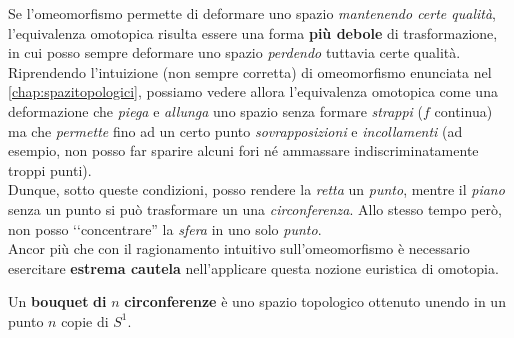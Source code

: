 \begin{intuit}
	Se l'omeomorfismo permette di deformare uno spazio \textit{mantenendo certe qualità}, l'equivalenza omotopica risulta essere una forma \textbf{più debole} di trasformazione, in cui posso sempre deformare uno spazio \textit{perdendo} tuttavia certe qualità.\\
	Riprendendo l'intuizione (non sempre corretta) di omeomorfismo enunciata nel \autoref{chap:spazitopologici}, possiamo vedere allora l'equivalenza omotopica come una deformazione che \textit{piega} e \textit{allunga} uno spazio senza formare \textit{strappi} ($f$ continua) ma che \textit{permette} fino ad un certo punto \textit{sovrapposizioni} e \textit{incollamenti} (ad esempio, non posso far sparire alcuni fori né ammassare indiscriminatamente troppi punti).\\
	Dunque, sotto queste condizioni, posso rendere la \textit{retta} un \textit{punto}, mentre il \textit{piano} senza un punto si può trasformare un una \textit{circonferenza}. Allo stesso tempo però, non posso ‘‘concentrare'' la \textit{sfera} in uno solo \textit{punto}.\\
	Ancor più che con il ragionamento intuitivo sull'omeomorfismo è necessario esercitare \textbf{estrema cautela} nell'applicare questa nozione euristica di omotopia.
\end{intuit}
\begin{define}\label{bouquet}
Un \textbf{bouquet} \textbf{di} $n$ \textbf{circonferenze} è uno spazio topologico ottenuto unendo in un punto $n$ copie di $S^1$.
\end{define}
